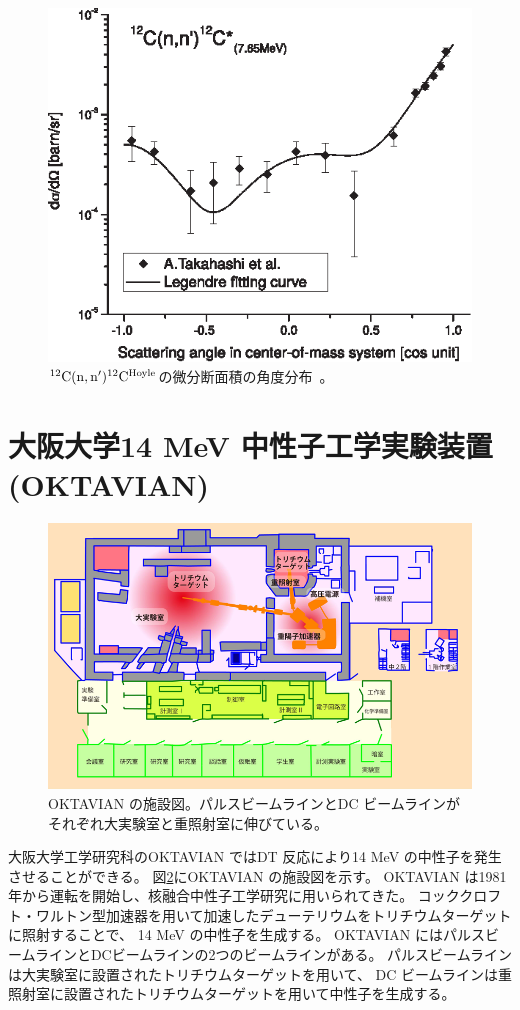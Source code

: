 \begin{figure}
  \centering
  \includegraphics[clip, width=0.6\columnwidth]{eps/cross_section_12C_n_n_12C_7.65.eps}
  \caption[${}^{12}{\rm C}({\rm n},{\rm n}'){}^{12}{\rm C}^{\rm Hoyle}$の微分断面積の角度分布。]
          {${}^{12}{\rm C}({\rm n},{\rm n}'){}^{12}{\rm C}^{\rm Hoyle}$の微分断面積の角度分布~\cite{kondoetal}。}
  \label{fig::sig_angle_dist}
\end{figure}

\section{大阪大学14 MeV 中性子工学実験装置 (OKTAVIAN)}
\begin{figure}
  \centering
  \includegraphics[clip, width=0.9\columnwidth]{pic/oktavian-sketch.png}
  \caption[OKTAVIAN の施設図。]
          {OKTAVIAN の施設図。パルスビームラインとDC ビームラインがそれぞれ大実験室と重照射室に伸びている。}
  \label{pic::oktavian-sketch}
\end{figure}
大阪大学工学研究科のOKTAVIAN ではDT 反応により14 MeV の中性子を発生させることができる。
図\ref{pic::oktavian-sketch}にOKTAVIAN の施設図を示す。
OKTAVIAN は1981年から運転を開始し、核融合中性子工学研究に用いられてきた。
コッククロフト・ワルトン型加速器を用いて加速したデューテリウムをトリチウムターゲットに照射することで、
14 MeV の中性子を生成する。
OKTAVIAN にはパルスビームラインとDCビームラインの2つのビームラインがある。
パルスビームラインは大実験室に設置されたトリチウムターゲットを用いて、
DC ビームラインは重照射室に設置されたトリチウムターゲットを用いて中性子を生成する。

